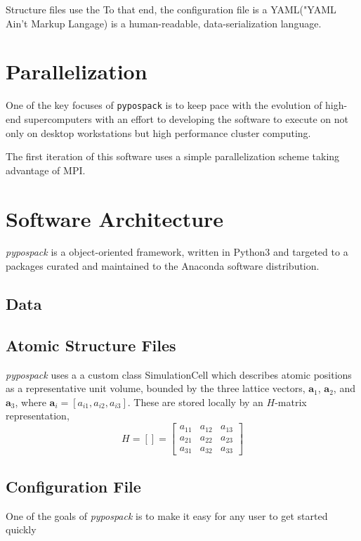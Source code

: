 Structure files use the 
To that end, the configuration file is a YAML("YAML Ain't Markup Langage) is a human-readable, data-serialization language.


\section{Parallelization}
One of the key focuses of \verb|pypospack| is to keep pace with the evolution of high-end supercomputers with an effort to developing the software to execute on not only on desktop workstations but high performance cluster computing.

The first iteration of this software uses a simple parallelization scheme taking advantage of MPI.
\section{Software Architecture}

\emph{pypospack} is a object-oriented framework, written in Python3 and targeted to a packages curated and maintained to the Anaconda software distribution.

\subsection{Data}
\subsection{Atomic Structure Files}

\emph{pypospack} uses a a custom class SimulationCell which describes atomic positions as a representative unit volume, bounded by the three lattice vectors, $\bm{a}_1$, $\bm{a}_2$, and $\bm{a}_3$, where $\bm{a}_i=[a_{i1},a_{i2},a_{i3}]$.  These are stored locally by an $H$-matrix representation,
\begin{equation}\label{eq:H-matrix}
     H=\left[\right] =
      \begin{bmatrix}
        a_{11}&a_{12}&a_{13}\\
        a_{21}&a_{22}&a_{23}\\
        a_{31}&a_{32}&a_{33}
      \end{bmatrix}
\end{equation}

\subsection{Configuration File}
One of the goals of \emph{pypospack} is to make it easy for any user to get started quickly

